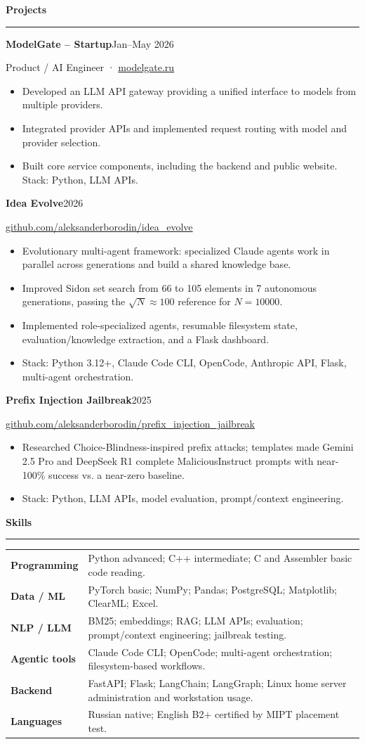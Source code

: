 \documentclass[10pt,a4paper]{article}
\newcommand{\sectiontitle}[1]{%
  \vspace{0.42em}%
  {\normalsize\bfseries\color{accent} #1}\par
  \vspace{0.10em}\hrule\vspace{0.24em}%
}
\newcommand{\entry}[4]{%
  \textbf{#1}\hfill {\color{textgray}#2}\par
  {\color{textgray}#3}\par
  #4\vspace{0.25em}%
}
\begin{document}
\sectiontitle{Projects}
\entry{ModelGate -- Startup}{Jan--May 2026}{Product / AI Engineer · \href{https://modelgate.ru}{modelgate.ru}}{%
\begin{itemize}
  \item Developed an LLM API gateway providing a unified interface to models from multiple providers.
  \item Integrated provider APIs and implemented request routing with model and provider selection.
  \item Built core service components, including the backend and public website. Stack: Python, LLM APIs.
\end{itemize}
}

\entry{Idea Evolve}{2026}{\href{https://github.com/aleksanderborodin/idea_evolve}{github.com/aleksanderborodin/idea\_evolve}}{%
\begin{itemize}
  \item Evolutionary multi-agent framework: specialized Claude agents work in parallel across generations and build a shared knowledge base.
  \item Improved Sidon set search from 66 to 105 elements in 7 autonomous generations, passing the $\sqrt{N}\approx100$ reference for $N=10000$.
  \item Implemented role-specialized agents, resumable filesystem state, evaluation/knowledge extraction, and a Flask dashboard.
  \item Stack: Python 3.12+, Claude Code CLI, OpenCode, Anthropic API, Flask, multi-agent orchestration.
\end{itemize}
}

\entry{Prefix Injection Jailbreak}{2025}{\href{https://github.com/aleksanderborodin/prefix_injection_jailbreak}{github.com/aleksanderborodin/prefix\_injection\_jailbreak}}{%
\begin{itemize}
  \item Researched Choice-Blindness-inspired prefix attacks; templates made Gemini 2.5 Pro and DeepSeek R1 complete MaliciousInstruct prompts with near-100\% success vs. a near-zero baseline.
  \item Stack: Python, LLM APIs, model evaluation, prompt/context engineering.
\end{itemize}
}

\sectiontitle{Skills}
\begin{tabularx}{\textwidth}{@{}>{\bfseries}p{2.65cm}X@{}}
Programming & Python advanced; C++ intermediate; C and Assembler basic code reading. \\
Data / ML & PyTorch basic; NumPy; Pandas; PostgreSQL; Matplotlib; ClearML; Excel. \\
NLP / LLM & BM25; embeddings; RAG; LLM APIs; evaluation; prompt/context engineering; jailbreak testing. \\
Agentic tools & Claude Code CLI; OpenCode; multi-agent orchestration; filesystem-based workflows. \\
Backend & FastAPI; Flask; LangChain; LangGraph; Linux home server administration and workstation usage. \\
Languages & Russian native; English B2+ certified by MIPT placement test. \\
\end{tabularx}
\end{document}
